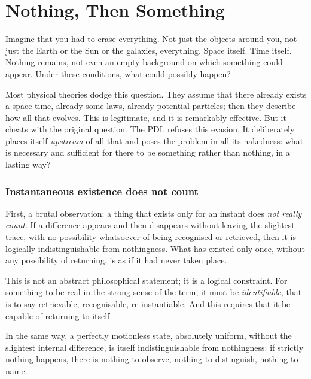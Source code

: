 \documentclass[12pt, a4paper, openright]{book}
\begin{document}
\chapter{Nothing, Then Something}

Imagine that you had to erase everything. Not just the objects around you, not just the Earth or the Sun or the galaxies, everything. Space itself. Time itself. Nothing remains, not even an empty background on which something could appear. Under these conditions, what could possibly happen?

\medskip

Most physical theories dodge this question. They assume that there already exists a space-time, already some laws, already potential particles; then they describe how all that evolves. This is legitimate, and it is remarkably effective. But it cheats with the original question. The PDL refuses this evasion. It deliberately places itself \emph{upstream} of all that and poses the problem in all its nakedness: what is necessary and sufficient for there to be something rather than nothing, in a lasting way?

\subsection*{Instantaneous existence does not count}

First, a brutal observation: a thing that exists only for an instant does \emph{not really count}. If a difference appears and then disappears without leaving the slightest trace, with no possibility whatsoever of being recognised or retrieved, then it is logically indistinguishable from nothingness. What has existed only once, without any possibility of returning, is as if it had never taken place.

\medskip

This is not an abstract philosophical statement; it is a logical constraint. For something to be real in the strong sense of the term, it must be \emph{identifiable}, that is to say retrievable, recognisable, re-instantiable. And this requires that it be capable of returning to itself.

\medskip

In the same way, a perfectly motionless state, absolutely uniform, without the slightest internal difference, is itself indistinguishable from nothingness: if strictly nothing happens, there is nothing to observe, nothing to distinguish, nothing to name.
\end{document}
